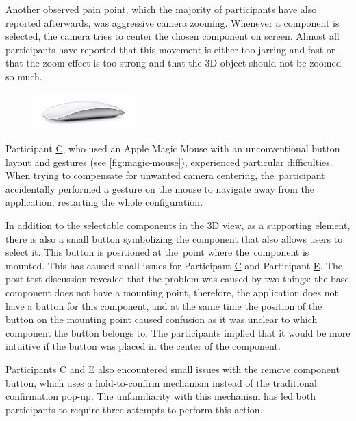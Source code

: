 Another observed pain point, which the majority of participants have also reported afterwards, was aggressive camera zooming. Whenever a component is selected, the camera tries to center the chosen component on screen. Almost all participants have reported that this movement is either too jarring and fast or that the zoom effect is too strong and that the 3D object should not be zoomed so much. 

\begin{figure}
    \centering
    \includegraphics[width=0.35\textwidth]{images/image_magicmouse.jpg}
    \label{fig:magic-mouse}
\end{figure}

Participant \hyperref[itm:C]{C}, who used an Apple Magic Mouse with an unconventional button layout and gestures (see \autoref{fig:magic-mouse}), experienced particular difficulties. When trying to compensate for unwanted camera centering, the~participant accidentally performed a gesture on the mouse to navigate away from the application, restarting the whole configuration.

In addition to the selectable components in the 3D view, as a supporting element, there is also a small button symbolizing the component that also allows users to select it. This button is positioned at the~point where the~component is mounted. This has caused small issues for Participant \hyperref[itm:C]{C} and Participant \hyperref[itm:E]{E}. The post-test discussion revealed that the problem was caused by two things: the base component does not have a mounting point, therefore, the application does not have a button for this component, and at the same time the position of the button on the mounting point caused confusion as it was unclear to which component the button belongs to. The participants implied that it would be more intuitive if the button was placed in the center of the component.

Participants \hyperref[itm:C]{C} and \hyperref[itm:E]{E} also encountered small issues with the remove component button, which uses a hold-to-confirm mechanism instead of the traditional confirmation pop-up. The unfamiliarity with this mechanism has led both participants to require three attempts to perform this action. 

